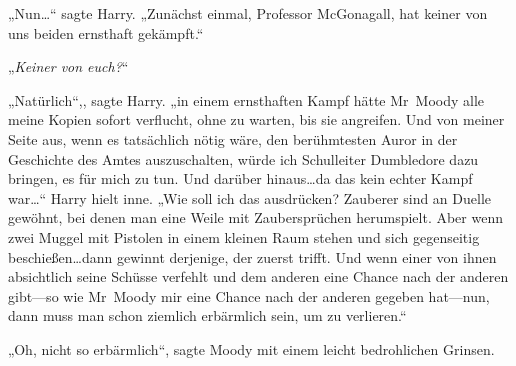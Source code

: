 „Nun…“ sagte Harry. „Zunächst einmal, Professor McGonagall, hat keiner von uns beiden ernsthaft gekämpft.“

„\emph{Keiner von euch?}“

„Natürlich“,, sagte Harry. „in einem ernsthaften Kampf hätte Mr~Moody alle meine Kopien sofort verflucht, ohne zu warten, bis sie angreifen. Und von meiner Seite aus, wenn es tatsächlich nötig wäre, den berühmtesten Auror in der Geschichte des Amtes auszuschalten, würde ich Schulleiter Dumbledore dazu bringen, es für mich zu tun. Und darüber hinaus…da das kein echter Kampf war…“ Harry hielt inne. „Wie soll ich das ausdrücken? Zauberer sind an Duelle gewöhnt, bei denen man eine Weile mit Zaubersprüchen herumspielt. Aber wenn zwei Muggel mit Pistolen in einem kleinen Raum stehen und sich gegenseitig beschießen…dann gewinnt derjenige, der zuerst trifft. Und wenn einer von ihnen absichtlich seine Schüsse verfehlt und dem anderen eine Chance nach der anderen gibt—so wie Mr~Moody mir eine Chance nach der anderen gegeben hat—nun, dann muss man schon ziemlich erbärmlich sein, um zu verlieren.“

„Oh, nicht so erbärmlich“, sagte Moody mit einem leicht bedrohlichen Grinsen.

